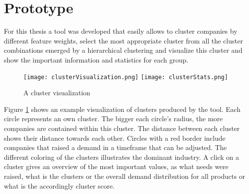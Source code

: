 \section{Prototype}
For this thesis a tool was developed that easily allows to cluster companies by different feature weights,
select the most appropriate cluster from all the cluster combinations emerged by a hierarchical clustering
and visualize this cluster and show the important information and statistics for each group.

\begin{figure}[ht]
\texttt{[image: clusterVisualization.png]}
\texttt{[image: clusterStats.png]}
\centering
\caption{A cluster visualization}
\label{fig:clusterVisualization}
\end{figure}

Figure \ref{fig:clusterVisualization} shows an example visualization of clusters produced by the tool.
Each circle represents an own cluster. The bigger each circle's radius, the more companies are contained within this cluster.
The distance between each cluster shows their distance towards each other. Circles with a red border include companies
that raised a demand in a timeframe that can be adjusted. The different coloring of the clusters illustrates the dominant industry.
A click on a cluster gives an overview of the most important
values, as what needs were raised, what is the clusters or the overall demand distribution for all products or what is
the accordingly cluster score.
